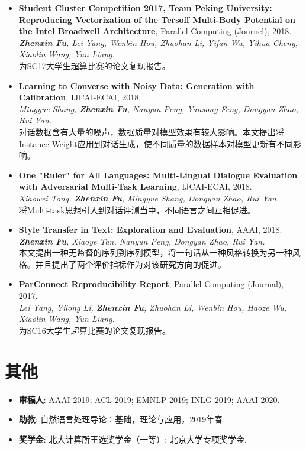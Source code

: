 \documentclass[letterpaper]{article}
\def\footerlink{https://zhenxinfu.com/zhenxinfu.pdf}
\begin{document}
\begin{itemize}
\item \textbf{Student Cluster Competition 2017, Team Peking University: Reproducing Vectorization of the Tersoff Multi-Body Potential on the Intel Broadwell Architecture}, Parallel Computing (Journel), 2018. \\
{\it \textbf{Zhenxin Fu}, Lei Yang, Wenbin Hou, Zhuohan Li, Yifan Wu, Yihua Cheng, Xiaolin Wang, Yun Liang.} \\
为SC17大学生超算比赛的论文复现报告。

\item \textbf{Learning to Converse with Noisy Data: Generation with Calibration}, IJCAI-ECAI, 2018. \\
  {\it Mingyue Shang, \textbf{Zhenxin Fu}, Nanyun Peng, Yansong Feng, Dongyan Zhao, Rui Yan.}  \\
  对话数据含有大量的噪声，数据质量对模型效果有较大影响。本文提出将Instance Weight应用到对话生成，使不同质量的数据样本对模型更新有不同影响。

\item \textbf{One "Ruler" for All Languages: Multi-Lingual Dialogue Evaluation with Adversarial Multi-Task Learning}, IJCAI-ECAI, 2018. \\
  {\it Xiaowei Tong, \textbf{Zhenxin Fu}, Mingyue Shang, Dongyan Zhao, Rui Yan.}  \\
  将Multi-task思想引入到对话评测当中，不同语言之间互相促进。

\item \textbf{Style Transfer in Text: Exploration and Evaluation}, AAAI, 2018. \\
  {\it \textbf{Zhenxin Fu}, Xiaoye Tan, Nanyun Peng, Dongyan Zhao, Rui Yan.} \\
  本文提出一种无监督的序列到序列模型，将一句话从一种风格转换为另一种风格。并且提出了两个评价指标作为对该研究方向的促进。
  
\item \textbf{ParConnect Reproducibility Report}, Parallel Computing (Journal), 2017.\\
  {\it Lei Yang, Yilong Li, \textbf{Zhenxin Fu}, Zhuohan Li, Wenbin Hou, Haoze Wu, Xiaolin Wang, Yun Liang.} \\
  为SC16大学生超算比赛的论文复现报告。
\end{itemize}


\section*{其他}
\begin{itemize}
  \item \textbf{审稿人}: AAAI-2019; ACL-2019; EMNLP-2019; INLG-2019; AAAI-2020.
  \item \textbf{助教}: 自然语言处理导论：基础，理论与应用，2019年春.
  \item \textbf{奖学金}: 北大计算所王选奖学金（一等）; 北京大学专项奖学金.
\end{itemize}




\end{document}

